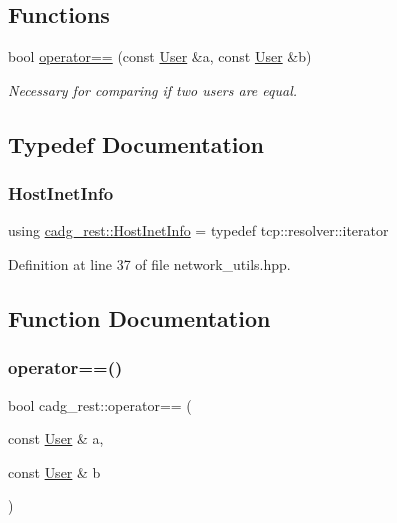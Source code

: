 \subsection*{Functions}
\begin{DoxyCompactItemize}
\item 
bool \mbox{\hyperlink{namespacecadg__rest_adc7f1e24da12c2c5dd1d8554a50d438f}{operator==}} (const \mbox{\hyperlink{structcadg__rest_1_1_user}{User}} \&a, const \mbox{\hyperlink{structcadg__rest_1_1_user}{User}} \&b)
\begin{DoxyCompactList}\small\item\em Necessary for comparing if two users are equal. \end{DoxyCompactList}\end{DoxyCompactItemize}


\subsection{Typedef Documentation}
\mbox{\label{namespacecadg__rest_a482207a93eaafbda9ea2db9247aa78c9}} 
\subsubsection{\texorpdfstring{HostInetInfo}{HostInetInfo}}
{\footnotesize\ttfamily using \mbox{\hyperlink{namespacecadg__rest_a482207a93eaafbda9ea2db9247aa78c9}{cadg\+\_\+rest\+::\+Host\+Inet\+Info}} = typedef tcp\+::resolver\+::iterator}



Definition at line 37 of file network\+\_\+utils.\+hpp.



\subsection{Function Documentation}
\mbox{\label{namespacecadg__rest_adc7f1e24da12c2c5dd1d8554a50d438f}} 
\subsubsection{\texorpdfstring{operator==()}{operator==()}}
{\footnotesize\ttfamily bool cadg\+\_\+rest\+::operator== (\begin{DoxyParamCaption}\item[{const \mbox{\hyperlink{structcadg__rest_1_1_user}{User}} \&}]{a,  }\item[{const \mbox{\hyperlink{structcadg__rest_1_1_user}{User}} \&}]{b }\end{DoxyParamCaption})\hspace{0.3cm}{\ttfamily [inline]}}



